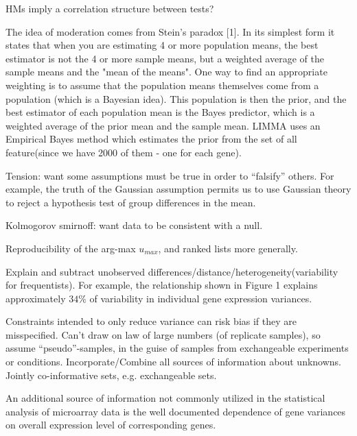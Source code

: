 \documentclass{article}
\begin{document}
HMs imply a correlation structure between tests?

The idea of moderation comes from Stein's paradox [1].  In its simplest form it states that when you are estimating 4 or more population means, the best estimator is not the 4 or more sample means, but a weighted average of the sample means and the "mean of the means".  One way to find an appropriate weighting is to assume that the population means themselves come from a population (which is a Bayesian idea).  This population is then the prior, and the best estimator of each population mean is the Bayes predictor, which is a weighted average of the prior mean and the sample mean.  LIMMA uses an Empirical Bayes method which estimates the prior from the set of all feature(since we have 2000 of them - one for each gene).


Tension: want some assumptions must be true in order to ``falsify'' others. For example, the truth of the Gaussian assumption permits us to use Gaussian theory to reject a hypothesis test of group differences in the mean.

Kolmogorov smirnoff: want data to be consistent with a null.


Reproducibility of the arg-max $u_{max}$, and ranked lists more generally.

Explain and subtract unobserved differences/distance/heterogeneity(variability for frequentists).  For example, the relationship shown in Figure 1 explains approximately $34\%$ of variability in individual gene expression variances. 

Constraints intended to only reduce variance can risk bias if they are misspecified.
Can't draw on law of large numbers (of replicate samples), so assume ``pseudo''-samples, in the guise of samples from exchangeable experiments or conditions.
Incorporate/Combine all sources of information about unknowns. Jointly co-informative sets, e.g. exchangeable sets.

An additional source of information not commonly utilized in the statistical analysis of microarray data is the well documented dependence of gene variances on overall expression level of corresponding genes. 
\end{document}
